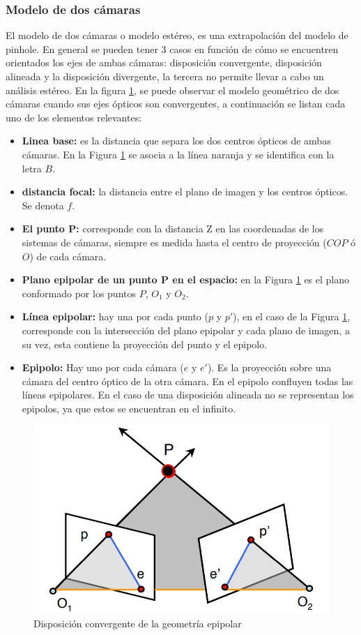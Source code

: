 \subsubsection{Modelo de dos cámaras}
El modelo de dos cámaras o modelo estéreo, es una extrapolación del modelo de pinhole. En general se pueden tener 3 casos en función de cómo se encuentren orientados los ejes de ambas cámaras: disposición convergente, disposición alineada y la disposición divergente, la tercera no permite llevar a cabo un análisis estéreo. En la figura \ref{epipolar_geometry}, se puede observar el modelo geométrico de dos cámaras cuando sus ejes ópticos son convergentes, a continuación se listan cada uno de los elementos relevantes:
\begin{itemize}
\item \textbf{Linea base:} es la distancia que separa los dos centros ópticos de ambas cámaras. En la Figura \ref{epipolar_geometry} se asocia a la línea naranja y se identifica con la letra $B$.
\item \textbf{distancia focal:} la distancia entre el plano de imagen y los centros ópticos. Se denota $f$.
\item\textbf{El punto P:} corresponde con la distancia Z en las coordenadas de los sistemas de cámaras, siempre es medida hasta el centro de proyección ($COP$ ó $O$) de cada cámara. 
\item \textbf{Plano epipolar de un punto P en el espacio:} en la Figura \ref{epipolar_geometry} es el plano conformado por los puntos $P$, $O_{1}$ y $O_{2}$.
\item\textbf{Línea epipolar:} hay una por cada punto ($p$ y $p'$), en el caso de la Figura \ref{epipolar_geometry}, corresponde con la intersección del plano epipolar y cada plano de imagen, a su vez, esta contiene la proyección del punto y el epipolo.
\item\textbf{Epipolo:} Hay uno por cada cámara ($e$ y $e'$). Es la proyección sobre una cámara del centro óptico de la otra cámara. En el epipolo confluyen todas las líneas epipolares. En el caso de una disposición alineada no se representan los epipolos, ya que estos se encuentran en el infinito.
\end{itemize}
\begin{figure}[H]
    \centering
    \includegraphics[scale=0.3]{Recursos/epipolar_geometry.png}
    \caption{Disposición convergente de la geometría epipolar}
    \label{epipolar_geometry}
\end{figure}
